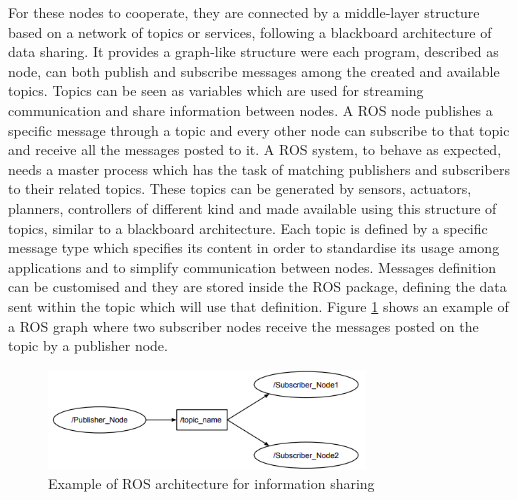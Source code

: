 For these nodes to cooperate, they are connected by a middle-layer structure based on a network of topics or services, following a blackboard architecture of data sharing.
It provides a graph-like structure were each program, described as node, can both publish and subscribe messages among the created and available topics.
Topics can be seen as variables which are used for streaming communication and share information between nodes.
A \Gls{ROS} node publishes a specific message through a topic and every other node can subscribe to that topic and receive all the messages posted to it.
A \Gls{ROS} system, to behave as expected, needs a master process which has the task of matching publishers and subscribers to their related topics.
These topics can be generated by sensors, actuators, planners, controllers of different kind and made available using this structure of topics, similar to a blackboard architecture.
Each topic is defined by a specific message type which specifies its content in order to standardise its usage among applications and to simplify communication between nodes.
Messages definition can be customised and they are stored inside the \Gls{ROS} package, defining the data sent within the topic which will use that definition.
Figure \ref{fig:ros-topic} shows an example of a \Gls{ROS} graph where two subscriber nodes receive the messages posted on the topic by a publisher node.

\begin{figure}[!ht]
	\begin{center}
		\includegraphics[width=0.75\textwidth]{Images/2-Background/ROSTopic-2021-04-22 10-51-37.png}
	\end{center}
	\caption{Example of \Gls{ROS} architecture for information sharing\cite{palsson_investigating_2017}}
	\label{fig:ros-topic}
\end{figure}

